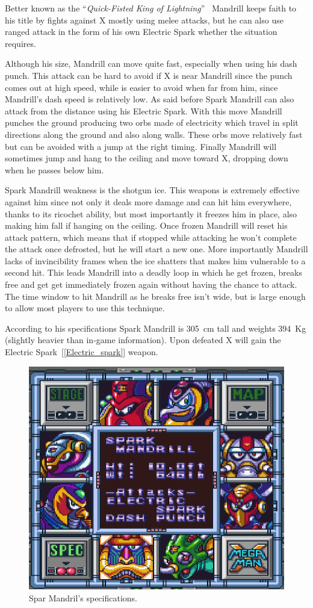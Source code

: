 Better known as the ``\textit{Quick-Fisted King of Lightning}''~\cite{book:MMX_Complete_art} Mandrill keeps faith to his title by fights against X mostly using melee attacks, but he can also use ranged attack in the form of his own Electric Spark whether the situation requires.
 
Although his size, Mandrill can move quite fast, especially when using his dash punch. This attack can be hard to avoid if X is near Mandrill since the punch comes out at high speed, while is easier to avoid when far from him, since Mandrill's dash speed is relatively low.  As said before Spark Mandrill can also attack from the distance using his Electric Spark. With this move Mandrill punches the ground producing two orbs made of electricity which travel in split directions along the ground and also along walls. These orbs move relatively fast but can be avoided with a jump at the right timing. Finally Mandrill will sometimes jump and hang to the ceiling and move toward X, dropping down when he passes below him. 

Spark Mandrill weakness is the shotgun ice. This weapons is extremely effective against him since not only it deals more damage and can hit him everywhere, thanks to its ricochet ability, but most importantly it freezes him in place, also making him fall if hanging on the ceiling. Once frozen Mandrill will reset his attack pattern, which means that if stopped while attacking he won't complete the attack once defrosted, but he will start a new one. More importantly Mandrill lacks of invincibility frames when the ice shatters that makes him vulnerable to a second hit. This leads Mandrill into a deadly loop in which he get frozen, breaks free and get get immediately frozen again without having the chance to attack. The time window to hit Mandrill as he breaks free isn't wide, but is large enough to allow most players to use this technique. 

According to his specifications Spark Mandrill is 305~cm tall and weights 394~Kg (slightly heavier than in-game information). Upon defeated X will gain the Electric Spark~[\ref{Electric_spark}] weapon.

\begin{figure}[htp]
	\centering
	\includegraphics[width=0.4\linewidth]{figures/X1/Spark_mandrill/Spark_mandril_specs.png}
	\caption{Spar Mandril's specifications.}
\end{figure}

